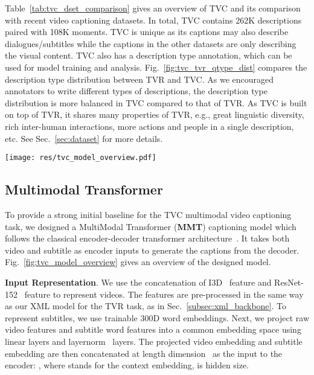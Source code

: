 \documentclass[runningheads]{llncs}
\begin{document}
Table~\ref{tab:tvc_dset_comparison} gives an overview of TVC and its comparison with recent video captioning datasets. 
In total, TVC contains 262K descriptions paired with 108K moments. 
TVC is unique as its captions may also describe dialogues/subtitles while the captions in the other datasets are only describing the visual content.
TVC also has a description type annotation, which can be used for model training and analysis.
Fig.~\ref{fig:tvc_tvr_qtype_dist} compares the description type distribution between TVR and TVC. 
As we encouraged annotators to write different types of descriptions, the description type distribution is more balanced in TVC compared to that of TVR. 
As TVC is built on top of TVR, it shares many properties of TVR, e.g., great linguistic diversity, rich inter-human interactions, more actions and people in a single description, etc. See Sec.~\ref{sec:dataset} for more details.




\begin{figure*}[!t]
  \centering
  \texttt{[image: res/tvc\_model\_overview.pdf]}
  \caption{Overview of the MultiModal Transformer (MMT) model for the TVC task. \textit{PE} stands for Positional Encoding}
  \label{fig:tvc_model_overview}
\end{figure*}




\subsection{Multimodal Transformer}
To provide a strong initial baseline for the TVC multimodal video captioning task, we designed a MultiModal Transformer (\textbf{MMT}) captioning model which follows the classical encoder-decoder transformer architecture~\cite{vaswani2017attention}. 
It takes both video and subtitle as encoder inputs to generate the captions from the decoder.
Fig.~\ref{fig:tvc_model_overview} gives an overview of the designed model.


\kern2mm
\noindent\textbf{Input Representation}.
We use the concatenation of I3D~\cite{carreira2017quo} feature and ResNet-152~\cite{he2016deep} feature to represent videos. The features are pre-processed in the same way as our XML model for the TVR task, as in Sec.~\ref{subsec:xml_backbone}.
To represent subtitles, we use trainable 300D word embeddings. 
Next, we project raw video features and subtitle word features into a common embedding space using linear layers and layernorm~\cite{ba2016layer} layers. 
The projected video embedding  and subtitle embedding  are then concatenated at length dimension~\cite{lei2020mart} as the input to the encoder: , where  stands for the context embedding,  is hidden size.
\end{document}
